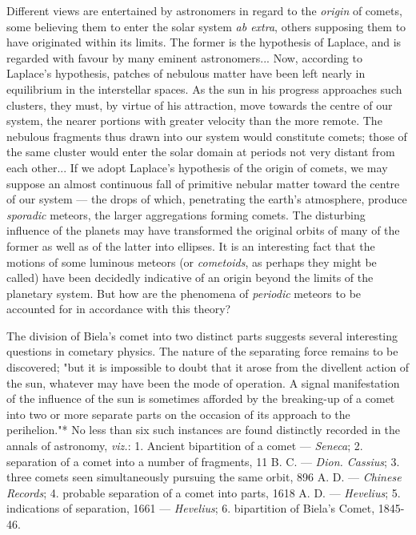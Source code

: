 \documentclass[a4paper, 12pt, oneside, polutonikogreek, english]{article}
\begin{document}
Different views are entertained by astronomers in regard to the \emph{origin} of comets, some believing them to enter the solar system \emph{ab extra}, others supposing them to have originated within its limits. The former is the hypothesis of Laplace, and is regarded with favour by many eminent astronomers... Now, according to Laplace's hypothesis, patches of nebulous matter have been left nearly in equilibrium in the interstellar spaces. As the sun in his progress approaches such clusters, they must, by virtue of his attraction, move towards the centre of our system, the nearer portions with greater velocity than the more remote. The nebulous fragments thus drawn into our system would constitute comets; those of the same cluster would enter the solar domain at periods not very distant from each other... If we adopt Laplace's hypothesis of the origin of comets, we may suppose an almost continuous fall of primitive nebular matter toward the centre of our system --- the drops of which, penetrating the earth's atmosphere, produce \emph{sporadic} meteors, the larger aggregations forming comets. The disturbing influence of the planets may have transformed the original orbits of many of the former as well as of the latter into ellipses. It is an interesting fact that the motions of some luminous meteors (or \emph{cometoids}, as perhaps they might be called) have been decidedly indicative of an origin beyond the limits of the planetary system. But how are the phenomena of \emph{periodic} meteors to be accounted for in accordance with this theory?

The division of Biela's comet into two distinct parts suggests several interesting questions in cometary physics. The nature of the separating force remains to be discovered; "but it is impossible to doubt that it arose from the divellent action of the sun, whatever may have been the mode of operation. A signal manifestation of the influence of the sun is sometimes afforded by the breaking-up of a comet into two or more separate parts on the occasion of its approach to the perihelion."* No less than six such instances are found distinctly recorded in the annals of astronomy, \emph{viz.}: 1. Ancient bipartition of a comet --- \emph{Seneca}; 2. separation of a comet into a number of fragments, 11 B. C. --- \emph{Dion. Cassius}; 3. three comets seen simultaneously pursuing the same orbit, 896 A. D. --- \emph{Chinese Records}; 4. probable separation of a comet into parts, 1618 A. D. --- \emph{Hevelius}; 5. indications of separation, 1661 --- \emph{Hevelius}; 6. bipartition of Biela's Comet, 1845-46.
\end{document}
